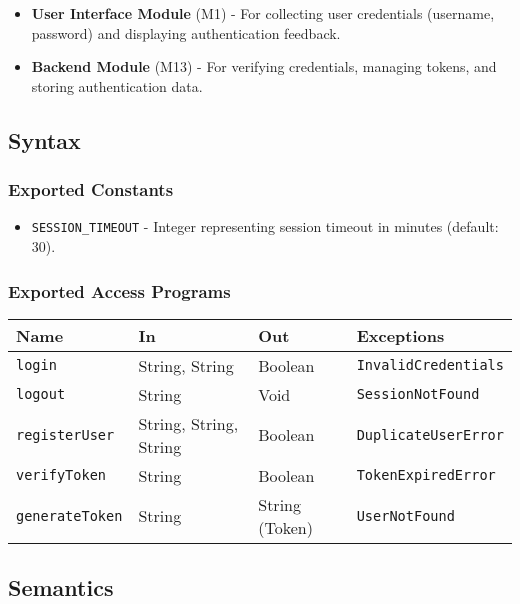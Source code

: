 \documentclass[12pt, titlepage]{article}
\begin{document}
\begin{itemize}
	\item \textbf{User Interface Module} (M1) - For collecting user credentials (username, password)
	and displaying authentication feedback.
	\item \textbf{Backend Module} (M13) - For verifying credentials, managing tokens, and storing
	authentication data.
\end{itemize}


\subsection{Syntax}

\subsubsection{Exported Constants}
\begin{itemize}
	\item \texttt{SESSION\_TIMEOUT} - Integer representing session timeout in minutes (default: 30).
\end{itemize}

\subsubsection{Exported Access Programs}

\begin{center}
\begin{tabular}{|p{3cm} | p{4cm} | p{4cm} | p{4cm}|}
\hline
\textbf{Name} & \textbf{In} & \textbf{Out} & \textbf{Exceptions} \\
\hline
\texttt{login} & String, String & Boolean & \texttt{InvalidCredentials} \\
\texttt{logout} & String & Void & \texttt{SessionNotFound} \\
\texttt{registerUser} & String, String, String & Boolean & \texttt{DuplicateUserError} \\
\texttt{verifyToken} & String & Boolean & \texttt{TokenExpiredError} \\
\texttt{generateToken} & String & String (Token) & \texttt{UserNotFound} \\
\hline
\end{tabular}
\end{center}

\subsection{Semantics}
\end{document}
